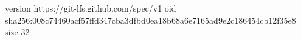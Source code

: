 version https://git-lfs.github.com/spec/v1
oid sha256:008c74460acf57ffd347cba3dfbd0ea18b68a6e7165ad9e2c186454cb12f35e8
size 32
